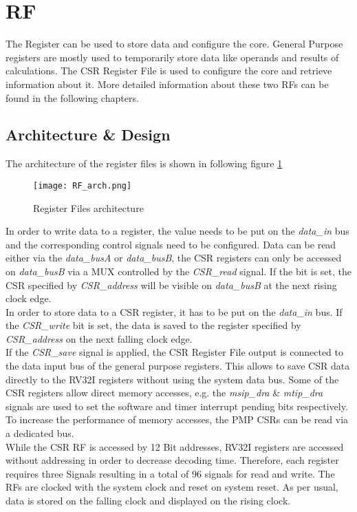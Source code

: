 \section{\acf{RF}}
The Register can be used to store data and configure the core. General Purpose
registers are mostly used to temporarily store data like operands and results of
calculations. The CSR Register File is used to configure the core and retrieve
information about it. More detailed information about these two RFs can be found in
the following chapters.
\clearpage
\subsection{Architecture \& Design}
The architecture of the register files is shown in following figure \ref{fig:RF_arch}

\begin{figure}[H]
	\centering
	\texttt{[image: RF\_arch.png]}
	\caption{Register Files architecture}
	\label{fig:RF_arch}
\end{figure}

In order to write data to a register, the value needs to be put on the \textit{data\_in} bus and the corresponding control signals need to be configured. Data can be read either via the \textit{data\_busA} or \textit{data\_busB}, the CSR registers can only be accessed on \textit{data\_busB} via a MUX controlled by the \textit{CSR\_read} signal. If the bit is set, the CSR specified by \textit{CSR\_address} will be visible on \textit{data\_busB} at the next rising clock edge.\\
In order to store data to a CSR register, it has to be put on the \textit{data\_in} bus. If the \textit{CSR\_write} bit is set, the data is saved to the register specified by \textit{CSR\_address} on the next falling clock edge.\\
If the \textit{CSR\_save} signal is applied, the CSR Register File output is connected to the data input bus of the general purpose registers. This allows to save CSR data directly to the RV32I registers without using the system data bus. Some of the CSR registers allow direct memory accesses, e.g. the \textit{msip\_dra} \& \textit{mtip\_dra} signals are used to set the software and timer interrupt pending bits respectively. To increase the performance of memory accesses, the PMP CSRs can be read via a dedicated bus.\\
While the CSR RF is accessed by 12 Bit addresses, RV32I registers are accessed without addressing in order to decrease decoding time. Therefore, each register requires three Signals resulting in a total of 96 signals for read and write. The RFs are clocked with the system clock and reset on system reset. As per usual, data is stored on the falling clock and displayed on the rising clock.
